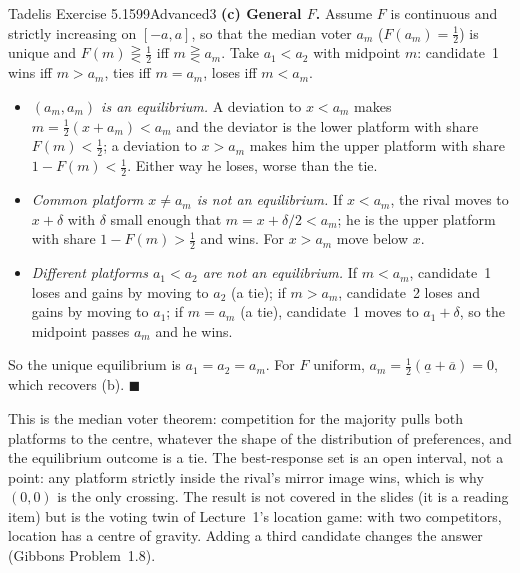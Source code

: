 \begin{exsol}{Tadelis Exercise 5.15}{99}{Advanced}{3}
\textbf{(c) General $F$.} Assume $F$ is continuous and strictly increasing on $[-a, a]$, so that the median voter $a_m$ ($F(a_m) = \tfrac12$) is unique and
$F(m) \gtreqless \tfrac12$ iff $m \gtreqless a_m$. Take $a_1 < a_2$ with midpoint $m$: candidate~1 wins iff $m > a_m$, ties iff $m = a_m$, loses iff $m < a_m$.
\begin{itemize}
  \item \emph{$(a_m, a_m)$ is an equilibrium.} A deviation to $x < a_m$ makes $m = \tfrac12(x + a_m) < a_m$ and the deviator is the lower platform with share
  $F(m) < \tfrac12$; a deviation to $x > a_m$ makes him the upper platform with share $1 - F(m) < \tfrac12$. Either way he loses, worse than the tie.
  \item \emph{Common platform $x \ne a_m$ is not an equilibrium.} If $x < a_m$, the rival moves to $x + \delta$ with $\delta$ small enough that
  $m = x + \delta/2 < a_m$; he is the upper platform with share $1 - F(m) > \tfrac12$ and wins. For $x > a_m$ move below $x$.
  \item \emph{Different platforms $a_1 < a_2$ are not an equilibrium.} If $m < a_m$, candidate~1 loses and gains by moving to $a_2$ (a tie); if $m > a_m$,
  candidate~2 loses and gains by moving to $a_1$; if $m = a_m$ (a tie), candidate~1 moves to $a_1 + \delta$, so the midpoint passes $a_m$ and he wins.
\end{itemize}
So the unique equilibrium is $a_1 = a_2 = a_m$. For $F$ uniform, $a_m = \tfrac12(\underline a + \overline a) = 0$, which recovers (b).
$\blacksquare$


\interp This is the median voter theorem: competition for the majority pulls both platforms to the centre, whatever the shape of the
distribution of preferences, and the equilibrium outcome is a tie. The best-response set is an open interval, not a point: any platform
strictly inside the rival's mirror image wins, which is why $(0,0)$ is the only crossing. The result is not covered in the slides (it is a
reading item) but is the voting twin of Lecture~1's location game: with two competitors, location has a centre of gravity. Adding a third candidate
changes the answer (Gibbons Problem~1.8).


\end{exsol}
